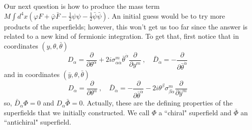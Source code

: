 \documentclass[a4paper,12pt]{article}
\numberwithin{equation}{section}
\numberwithin{exe}{section}
\newcommand{\p}{{\partial}}
\newcommand{\Db}{{\bar D}}
\newcommand{\yb}{{\bar y}}
\newcommand{\Fb}{{\bar F}}
\renewcommand{\a}{{\alpha}}
\newcommand{\ad}{{\dot\alpha}}
\renewcommand{\b}{{\beta}}
\newcommand{\s}{{\sigma}}
\renewcommand{\t}{{\theta}}
\newcommand{\tb}{{\bar\theta}}
\newcommand{\vphi}{{\varphi}}
\newcommand{\vphib}{{\bar\varphi}}
\newcommand{\Phib}{{\bar \Phi}}
\newcommand{\psib}{{\bar\psi}}
\begin{document}
Our next question is how to produce the mass term $M\int d^4 x(\vphi F + \vphib\Fb - \frac12 \psi\psi - \frac12 \psib\psib)$. An initial guess would be to try more products of the superfields; however, this won't get us too far since the answer is related to a new kind of fermionic integration. To get that, first notice that in coordinates $(y,\t,\tb)$
	\begin{equation}
	D_\a = \frac{\p}{\p\t^\a} + 2i\s^m_{\a\ad} \tb^\ad \frac{\p}{\p y^m}\ ,\quad \Db_\ad = -\frac{\p}{\p\tb^\ad}
	\end{equation}
and in coordinates $(\yb, \t,\tb)$
	\begin{equation}
	D_\a = \frac{\p}{\p \t^\a}\ ,\quad \Db_\ad = -\frac{\p}{\p\tb^\ad} -2i\t^\b \s^m_{\b\ad} \frac{\p}{\p\yb^m}
	\end{equation}
so, $\Db_\ad \Phi = 0$ and $D_\a \Phib = 0$. Actually, these are the defining properties of the superfields that we initially constructed. We call $\Phi$ a ``chiral" superfield and $\Phib$ an ``antichiral" superfield.
\end{document}
